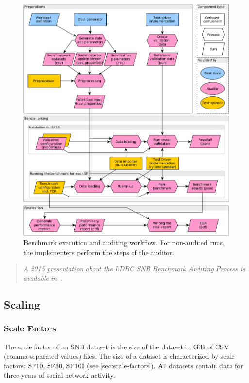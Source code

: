\begin{figure}[h]
    \centering
    \includegraphics[scale=\yedscale]{figures/auditing-workflow}
    \caption{Benchmark execution and auditing workflow. For non-audited runs, the implementers perform the steps of the auditor.}
    \label{fig:audit-workflow}
\end{figure}

\begin{quote}
    \emph{A 2015 presentation about the LDBC SNB Benchmark Auditing Process is available in~\cite{auditing}.}
\end{quote}

\subsection{Scaling}

\subsubsection{Scale Factors}

The scale factor of an SNB dataset is the size of the dataset in GiB of CSV (comma-separated values) files.
The size of a dataset is characterized by scale factors: SF10, SF30, SF100 \etc (see \autoref{sec:scale-factors}).
All datasets contain data for three years of social network activity.

